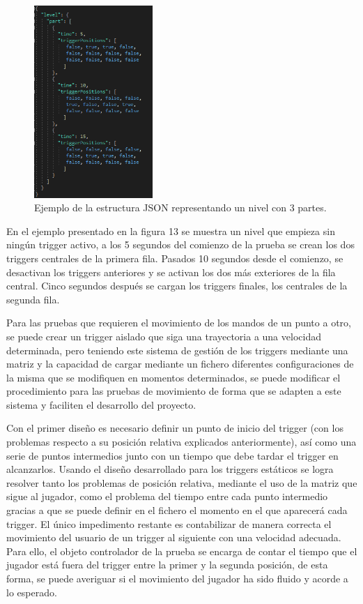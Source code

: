 \begin{figure}
  \centering
    \includegraphics[width=0.4\textwidth]{04.Desarrollo/02.Entrega2/02.Iteracion2_2/00.Figuras/05.json.png}
    \caption{Ejemplo de la estructura JSON representando un nivel con 3 partes.}
    \label{fig:E2_json}
\end{figure}


En el ejemplo presentado en la figura 13 se muestra un nivel que empieza sin ningún trigger activo, a los 5 segundos del comienzo de la prueba se crean los dos triggers centrales de la primera fila. Pasados 10 segundos desde el comienzo, se desactivan los triggers anteriores y se activan los dos más exteriores de la fila central. Cinco segundos después se cargan los triggers finales, los centrales de la segunda fila.

Para las pruebas que requieren el movimiento de los mandos de un punto a otro, se puede crear un trigger aislado que siga una trayectoria a una velocidad determinada, pero teniendo este sistema de gestión de los triggers mediante una matriz y la capacidad de cargar mediante un fichero diferentes configuraciones de la misma que se modifiquen en momentos determinados, se puede modificar el procedimiento para las pruebas de movimiento de forma que se adapten a este sistema y faciliten el desarrollo del proyecto.

Con el primer diseño es necesario definir un punto de inicio del trigger (con los problemas respecto a su posición relativa explicados anteriormente), así como una serie de puntos intermedios junto con un tiempo que debe tardar el trigger en alcanzarlos. Usando el diseño desarrollado para los triggers estáticos se logra resolver tanto los problemas de posición relativa, mediante el uso de la matriz que sigue al jugador, como el problema del tiempo entre cada punto intermedio gracias a que se puede definir en el fichero el momento en el que aparecerá cada trigger. El único impedimento restante es contabilizar de manera correcta el movimiento del usuario de un trigger al siguiente con una velocidad adecuada. Para ello, el objeto controlador de la prueba se encarga de contar el tiempo que el jugador está fuera del trigger entre la primer y la segunda posición, de esta forma, se puede averiguar si el movimiento del jugador ha sido fluido y acorde a lo esperado. 

